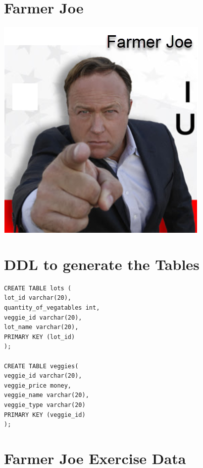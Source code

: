 \newpage
\section  * {Farmer Joe}
\includegraphics[scale=0.6]{images/FarmerJoe.png}

\section{DDL to generate the Tables}
\begin{verbatim}
CREATE TABLE lots (
lot_id varchar(20),
quantity_of_vegatables int,
veggie_id varchar(20),
lot_name varchar(20),
PRIMARY KEY (lot_id)
);

CREATE TABLE veggies(
veggie_id varchar(20),
veggie_price money,
veggie_name varchar(20),
veggie_type varchar(20)
PRIMARY KEY (veggie_id)
);
\end{verbatim}


\section {Farmer Joe Exercise Data}

